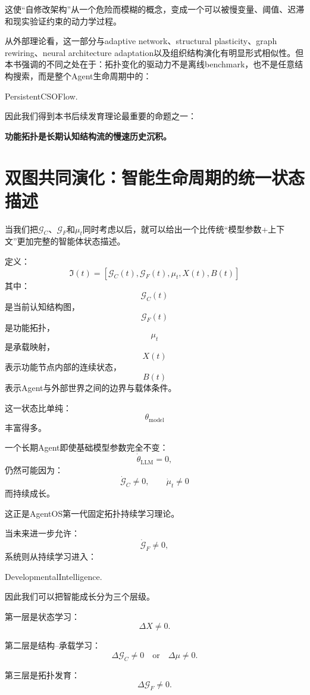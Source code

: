 这使“自修改架构”从一个危险而模糊的概念，变成一个可以被慢变量、阈值、迟滞和现实验证约束的动力学过程。

从外部理论看，这一部分与adaptive network、structural plasticity、graph rewiring、neural architecture adaptation以及组织结构演化有明显形式相似性。但本书强调的不同之处在于：拓扑变化的驱动力不是离线benchmark，也不是任意结构搜索，而是整个Agent生命周期中的：
\begin{statementbox}
PersistentCSOFlow.
\end{statementbox}

因此我们得到本书后续发育理论最重要的命题之一：
\begin{proposition*}
\bfseries
功能拓扑是长期认知结构流的慢速历史沉积。
\end{proposition*}

\section{双图共同演化：智能生命周期的统一状态描述}

当我们把$\mathcal G_C$、$\mathcal G_F$和$\mu_t$同时考虑以后，就可以给出一个比传统“模型参数+上下文”更加完整的智能体状态描述。

定义：
\[
\boxed{
\mathfrak I(t)
=
\left[
\mathcal G_C(t),
\mathcal G_F(t),
\mu_t,
X(t),
B(t)
\right]
}
\]
其中：
\[
\mathcal G_C(t)
\]
是当前认知结构图，
\[
\mathcal G_F(t)
\]
是功能拓扑，
\[
\mu_t
\]
是承载映射，
\[
X(t)
\]
表示功能节点内部的连续状态，
\[
B(t)
\]
表示Agent与外部世界之间的边界与载体条件。

这一状态比单纯：
\[
\theta_{\text{model}}
\]
丰富得多。

一个长期Agent即使基础模型参数完全不变：
\[
\dot\theta_{\text{LLM}}=0,
\]
仍然可能因为：
\[
\dot{\mathcal G}_C\neq0,
\qquad
\dot\mu_t\neq0
\]
而持续成长。

这正是AgentOS第一代固定拓扑持续学习理论。

当未来进一步允许：
\[
\dot{\mathcal G}_F\neq0,
\]
系统则从持续学习进入：
\begin{statementbox}
DevelopmentalIntelligence.
\end{statementbox}

因此我们可以把智能成长分为三个层级。

第一层是状态学习：
\[
\Delta X\neq0.
\]

第二层是结构--承载学习：
\[
\Delta\mathcal G_C\neq0
\quad\text{or}\quad
\Delta\mu\neq0.
\]

第三层是拓扑发育：
\[
\Delta\mathcal G_F\neq0.
\]

